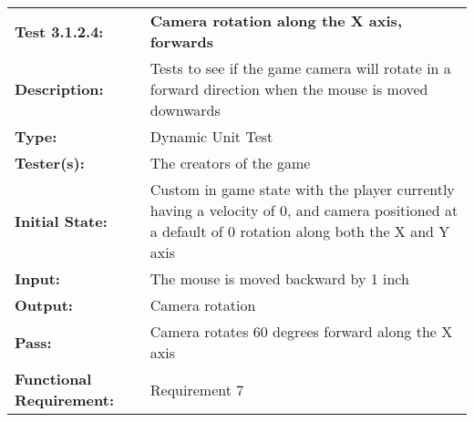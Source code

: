 \documentclass[12pt, titlepage]{article}
\begin{document}
\begin{mdframed}[linewidth=1pt]
\begin{tabularx}{\textwidth}{@{}p{3cm}X@{}}
{\bf Test 3.1.2.4:} & {\bf Camera rotation along the X axis, forwards}\\[\baselineskip]
{\bf Description:} & Tests to see if the game camera will rotate in a forward direction when the mouse is moved downwards\\[0.5\baselineskip]
{\bf Type:} & Dynamic Unit Test\\[0.5\baselineskip]
{\bf Tester(s):} & The creators of the game\\[0.5\baselineskip]
{\bf Initial State:} & Custom in game state with the player currently having a velocity of 0, and camera positioned at a default of 0 rotation along both the X and Y axis\\[0.5\baselineskip]
{\bf Input:} & The mouse is moved backward by 1 inch\\[0.5\baselineskip]
{\bf Output:} & Camera rotation\\[0.5\baselineskip]
{\bf Pass:} & Camera rotates 60 degrees forward along the X axis \\[0.5\baselineskip]
{\bf Functional Requirement:} & Requirement 7
\end{tabularx}
\end{mdframed}
\end{document}

